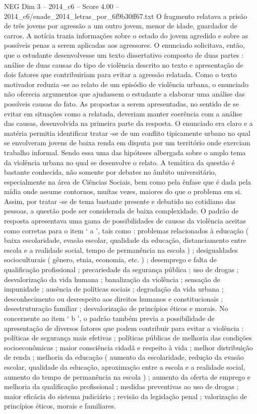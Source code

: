 \begin{textsample}{NEG Dim 3 – 2014\_c6 – Score 4.00 – 2014\_c6/enade\_2014\_letras\_por\_6f9b30ff67.txt}
O fragmento relatava a prisão de três jovens por agressão a um outro jovem, menor de idade, guardador de carros.
A notícia trazia informações sobre o estado do jovem agredido e sobre as possíveis penas a serem aplicadas aos agressores.
O enunciado solicitava, então, que o estudante desenvolvesse um texto dissertativo composto de duas partes : análise de duas causas do tipo de violência descrito no texto e apresentação de dois fatores que contribuiriam para evitar a agressão relatada.
Como o texto motivador reduzia -se ao relato de um episódio de violência urbana, o enunciado não oferecia argumentos que ajudassem o estudante a elaborar uma análise das possíveis causas do fato.
As propostas a serem apresentadas, no sentido de se evitar em situações como a relatada, deveriam manter coerência com a análise das causas, desenvolvida na primeira parte da resposta.
O enunciado era claro e a matéria permitia identificar tratar -se de um conflito tipicamente urbano no qual se envolveram jovens de baixa renda em disputa por um território onde exerciam trabalho informal.
Sendo essa uma das hipóteses albergada sobre o amplo tema da violência urbana no qual se desenvolve o relato.
A temática da questão é bastante conhecida, não somente por debates no âmbito universitário, especialmente na área de Ciências Sociais, bem como pela ênfase que é dada pela mídia onde assume contornos, muitas vezes, maiores do que o problema em si.
Assim, por tratar -se de tema bastante presente e debatido no cotidiano das pessoas, a questão pode ser considerada de baixa complexidade.
O padrão de resposta apresentava uma gama de possibilidades de causas da violência aceitas como corretas para o item ‘ a ’, tais como : problemas relacionados à educação ( baixa escolaridade, evasão escolar, qualidade da educação, distanciamento entre escola e a realidade social, tempo de permanência na escola ) ; desigualdades socioculturais ( gênero, etnia, economia, etc. ) ; desemprego e falta de qualificação profissional ; precariedade da segurança pública ; uso de drogas ; desvalorização da vida humana ; banalização da violência ; sensação de impunidade ; ausência de políticas sociais ; degradação da vida urbana ; desconhecimento ou desrespeito aos direitos humanos e constitucionais ; desestruturação familiar ; desvalorização de princípios éticos e morais.
No concernente ao item ‘ b ’, o padrão também previa a possibilidade de apresentação de diversos fatores que podem contribuir para evitar a violência : políticas de segurança mais efetivas ; políticas públicas de melhoria das condições socioeconômicas ; maior consciência cidadã e respeito à vida ; melhor distribuição de renda ; melhoria da educação ( aumento da escolaridade, redução da evasão escolar, qualidade da educação, aproximação entre a escola e a realidade social, aumento do tempo de permanência na escola ) ; aumento da oferta de emprego e melhoria da qualificação profissional ; medidas preventivas ao uso de drogas ; maior eficácia do sistema judiciário ; revisão da legislação penal ; valorização de princípios éticos, morais e familiares.

\end{textsample}
